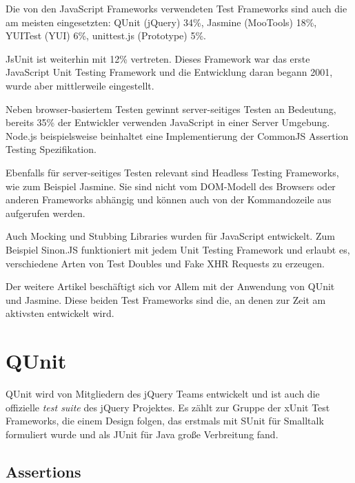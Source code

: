 \documentclass[11pt, a4paper]{article}
\begin{document}
Die von den JavaScript Frameworks verwendeten Test Frameworks sind auch die
am meisten eingesetzten: QUnit\cite{zaefferer_qunit_2011} (jQuery) 34\%,
Jasmine\cite{jasmine_jasmine_2011} (MooTools) 18\%,
YUITest\cite{yahoo_inc._yui_2011} (YUI) 6\%,
unittest.js\cite{fuchs_unittest.js_2011} (Prototype) 5\%.

JsUnit\cite{jsunit_jsunit_2011} ist weiterhin mit 12\% vertreten. Dieses
Framework war das erste JavaScript Unit Testing Framework und die Entwicklung
daran begann 2001, wurde aber mittlerweile eingestellt.

Neben browser-basiertem Testen gewinnt server-seitiges Testen an Bedeutung,
bereits 35\% der Entwickler verwenden JavaScript in einer Server Umgebung.
Node.js beispielsweise beinhaltet eine Implementierung der CommonJS Assertion Testing
Spezifikation\cite{node.js_node.js_2011}.

Ebenfalls für server-seitiges Testen relevant sind Headless Testing Frameworks,
wie zum Beispiel Jasmine. Sie sind nicht vom DOM-Modell des Browsers oder
anderen Frameworks abhängig und können auch von der Kommandozeile aus aufgerufen
werden.

Auch Mocking und Stubbing Libraries wurden für JavaScript entwickelt.
Zum Beispiel Sinon.JS\cite{johansen_sinon.js_2011} funktioniert mit jedem Unit
Testing Framework und erlaubt es, verschiedene Arten von Test Doubles und Fake
XHR Requests zu erzeugen.

Der weitere Artikel beschäftigt sich vor Allem mit der Anwendung von QUnit und
Jasmine. Diese beiden Test Frameworks sind die, an denen zur Zeit am
aktivsten entwickelt wird.

\clearpage

\section{QUnit}

QUnit\cite{zaefferer_qunit_2011} wird von Mitgliedern des jQuery
Teams\cite{resig_jquery_2011} entwickelt und ist auch die offizielle
\emph{test suite} des jQuery Projektes. Es zählt zur Gruppe der
xUnit Test Frameworks\cite{fowler_xunit_2010}, die einem Design folgen,
das erstmals mit SUnit\cite{beck_simple_1994} für Smalltalk formuliert
wurde und als JUnit\cite{gamma_junit_2011} für Java große Verbreitung fand.

\subsection{Assertions}
\end{document}
